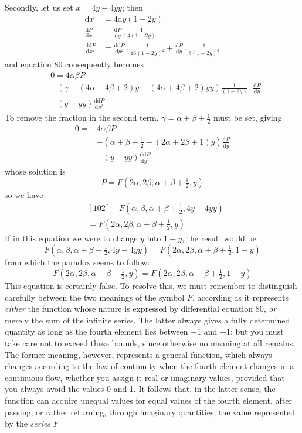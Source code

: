 Secondly, let us set $x=4y-4yy$; then
\[
\begin{aligned}
\mathrm dx&=4\mathrm dy(1-2y)\\
\frac{\mathrm dP}{\mathrm dx}&=\frac{\mathrm dP}{\mathrm dy}\mathbin{.}\frac1{4(1-2y)}\\
\frac{\mathrm{dd}P}{\mathrm dx^2}&=\frac{\mathrm{dd}P}{\mathrm dy^2}\mathbin{.}\frac1{16(1-2y)^2}
+\frac{\mathrm dP}{\mathrm dy}\mathbin{.}\frac1{8(1-2y)^3}
\end{aligned}
\]
and equation 80 consequently becomes
\[
\begin{aligned}
&0=4\alpha\beta P\\
&-(\gamma-(4\alpha+4\beta+2)y+(4\alpha+4\beta+2)yy)\frac1{(1-2y)}\mathbin{.}\frac{\mathrm dP}{\mathrm dy}\\
&-(y-yy)\frac{\mathrm{dd}P}{\mathrm dy^2}
\end{aligned}
\]
To remove the fraction in the second term, $\gamma=\alpha+\beta+\frac12$ must be set, giving
\[
\begin{aligned}
0={}&4\alpha\beta P\\
&-(\alpha+\beta+\tfrac12-(2\alpha+2\beta+1)y)\frac{\mathrm dP}{\mathrm dy}\\
&-(y-yy)\frac{\mathrm{dd}P}{\mathrm dy^2}
\end{aligned}
\]
whose solution is
\[
P=F(2\alpha,2\beta,\alpha+\beta+\tfrac12,y)
\]
so we have
\[
\begin{aligned}&[102]\quad F(\alpha,\beta,\alpha+\beta+\tfrac12,4y-4yy)\\&=F(2\alpha,2\beta,\alpha+\beta+\tfrac12,y)\end{aligned}
\]
If in this equation we were to change $y$ into $1-y$, the result would be
\[
F(\alpha,\beta,\alpha+\beta+\tfrac12,4y-4yy)=F(2\alpha,2\beta,\alpha+\beta+\tfrac12,1-y)
\]
from which the paradox seems to follow:
\[
F(2\alpha,2\beta,\alpha+\beta+\tfrac12,y)=F(2\alpha,2\beta,\alpha+\beta+\tfrac12,1-y)
\]
This equation is certainly false. To resolve this, we must remember to distinguish carefully between the two meanings of the symbol $F$, according as it represents \textit{either} the function whose nature is expressed by differential equation 80, \textit{or} merely the sum of the infinite series. The latter always gives a fully determined quantity as long as the fourth element lies between $-1$ and $+1$; but you must take care not to exceed these bounds, since otherwise no meaning at all remains. The former meaning, however, represents a general function, which always changes according to the law of continuity when the fourth element changes in a continuous flow, whether you assign it real or imaginary values, provided that you always avoid the values 0 and 1. It follows that, in the latter sense, the function can acquire unequal values for equal values of the fourth element, after passing, or rather returning, through imaginary quantities; the value represented by the \textit{series} $F$

